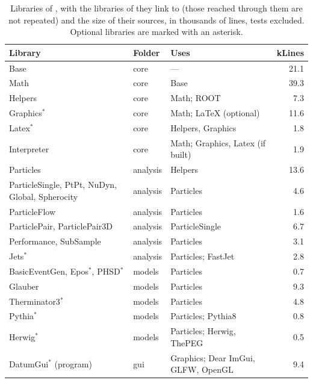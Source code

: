 \begin{table}[t]
  \centering
  \caption{Libraries of \Datum{}, with the libraries of \Datum{} they link to (those reached through them are not
  repeated) and the size of their sources, in thousands of lines, tests excluded. Optional libraries are marked with
  an asterisk.}
  \label{tab:libraries}
  \small
  \begin{tabular}{@{}p{5cm}llr@{}}
    \toprule
    Library & Folder & Uses & kLines \\
    \midrule
    Base           & core     & ---                                & 21.1 \\
    Math           & core     & Base                               & 39.3 \\
    Helpers        & core     & Math; ROOT                         &  7.3 \\
    Graphics$^*$   & core     & Math; LaTeX (optional)             & 11.6 \\
    Latex$^*$      & core     & Helpers, Graphics                  &  1.8 \\
    Interpreter    & core     & Math; Graphics, Latex (if built)   &  1.9 \\
    \midrule
    Particles      & analysis & Helpers                            & 13.6 \\
    \raggedright ParticleSingle, PtPt, NuDyn, Global, Spherocity & analysis & Particles & 4.6 \\
    ParticleFlow   & analysis & Particles                          &  1.6 \\
    ParticlePair, ParticlePair3D & analysis & ParticleSingle      &  6.7 \\
    Performance, SubSample & analysis & Particles                 &  3.1 \\
    Jets$^*$       & analysis & Particles; FastJet                 &  2.8 \\
    \midrule
    \raggedright BasicEventGen, Epos$^*$, PHSD$^*$ & models & Particles         &  0.7 \\
    Glauber        & models   & Particles                          &  9.3 \\
    Therminator3$^*$ & models & Particles                          &  4.8 \\
    Pythia$^*$     & models   & Particles; Pythia8                 &  0.8 \\
    Herwig$^*$     & models   & Particles; Herwig, ThePEG          &  0.5 \\
    \midrule
    DatumGui$^*$ (program) & gui & Graphics; Dear ImGui, GLFW, OpenGL &  9.4 \\
    \bottomrule
  \end{tabular}
\end{table}

